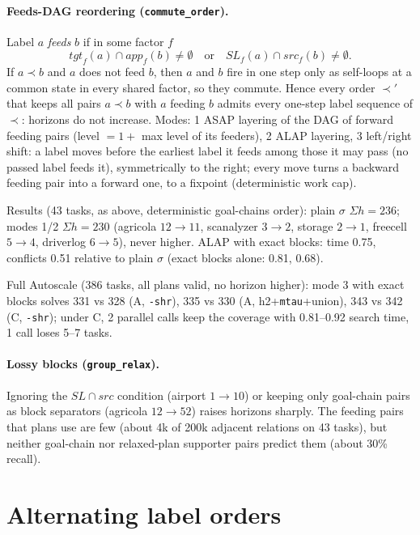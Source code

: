 \documentclass[11pt,a4paper]{article}
\newcommand{\SL}{\mathit{SL}}
\newcommand{\src}{\mathit{src}}
\newcommand{\tgt}{\mathit{tgt}}
\newcommand{\app}{\mathit{app}}
\begin{document}
\paragraph{Feeds-DAG reordering (\texttt{commute\_order}).} Label $a$ \emph{feeds} $b$ if in some
factor $f$
\[
  \tgt_f(a) \cap \app_f(b) \neq \emptyset \quad\text{or}\quad \SL_f(a) \cap \src_f(b) \neq \emptyset .
\]
If $a \prec b$ and $a$ does not feed $b$, then $a$ and $b$ fire in one step only as self-loops at a
common state in every shared factor, so they commute. Hence every order $\prec'$ that keeps all
pairs $a \prec b$ with $a$ feeding $b$ admits every one-step label sequence of $\prec$: horizons do
not increase. Modes: 1 ASAP layering of the DAG of forward feeding pairs (level $=1+$ max level of
its feeders), 2 ALAP layering, 3 left/right shift: a label moves before the earliest label it feeds
among those it may pass (no passed label feeds it), symmetrically to the right; every move turns a
backward feeding pair into a forward one, to a fixpoint (deterministic work cap).

Results (43 tasks, as above, deterministic goal-chains order): plain $\sigma$ $\Sigma h = 236$;
modes 1/2 $\Sigma h = 230$ (agricola $12\to11$, scanalyzer $3\to2$, storage $2\to1$,
freecell $5\to4$, driverlog $6\to5$), never higher. ALAP with exact blocks: time 0.75, conflicts 0.51
relative to plain $\sigma$ (exact blocks alone: 0.81, 0.68).

Full Autoscale (386 tasks, all plans valid, no horizon higher): mode 3 with exact blocks solves
331 vs 328 (A, \texttt{-shr}), 335 vs 330 (A, h2+\texttt{mtau}+union), 343 vs 342 (C, \texttt{-shr});
under C, 2 parallel calls keep the coverage with 0.81--0.92 search time, 1 call loses 5--7 tasks.

\paragraph{Lossy blocks (\texttt{group\_relax}).} Ignoring the $\SL \cap \src$ condition
(airport $1 \to 10$) or keeping only goal-chain pairs as block separators (agricola $12 \to 52$)
raises horizons sharply. The feeding pairs that plans use are few (about 4k of 200k adjacent
relations on 43 tasks), but neither goal-chain nor relaxed-plan supporter pairs predict them (about
30\% recall).

\section{Alternating label orders}
\end{document}
